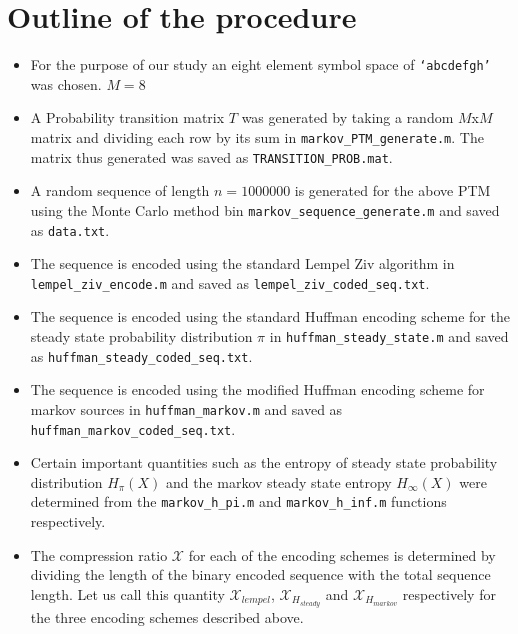 \documentclass[a4paper,10pt]{article}
\begin{document}
\section*{Outline of the procedure}
\begin{itemize}
\item{For the purpose of our study an eight element symbol space of \texttt{`abcdefgh'} was chosen. $M =8$}

\item{A Probability transition matrix $T$ was generated by taking a random $M$x$M$ matrix and dividing each row by its sum in \texttt{markov\_PTM\_generate.m}. The matrix thus generated was saved as \texttt{TRANSITION\_PROB.mat}.}

\item{A random sequence of length $n = 1000000$ is generated for the above PTM using the Monte Carlo method bin \texttt{markov\_sequence\_generate.m} and saved as \texttt{data.txt}.}

\item{The sequence is encoded using the standard Lempel Ziv algorithm in \\ \texttt{lempel\_ziv\_encode.m} and saved as \texttt{lempel\_ziv\_coded\_seq.txt}.}

\item{The sequence is encoded using the standard Huffman encoding scheme for the steady state probability distribution $\pi$ in \texttt{huffman\_steady\_state.m} and saved as \texttt{huffman\_steady\_coded\_seq.txt}.}

\item{The sequence is encoded using the modified Huffman encoding scheme for markov sources in \texttt{huffman\_markov.m} and saved as \texttt{huffman\_markov\_coded\_seq.txt}.}

\item{Certain important quantities such as the entropy of steady state probability distribution $H_{\pi}(X)$ and the markov steady state entropy $H_{\infty}(X)$ were determined from the \texttt{markov\_h\_pi.m} and \texttt{markov\_h\_inf.m} functions respectively.}

\item{The compression ratio $\mathcal{X}$ for each of the encoding schemes is determined by dividing the length of the binary encoded sequence with the total sequence length. Let us call this quantity $\mathcal{X}_{lempel}$, $\mathcal{X}_{H_{steady}}$ and $\mathcal{X}_{H_{markov}}$ respectively for the three encoding schemes described above.} 
\end{itemize}
\end{document}

